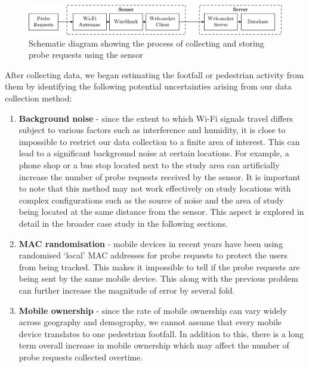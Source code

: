 \begin{figure} 
	\centering \includegraphics[width=\linewidth]
		{images/datacollection_schematic.jpeg}
	\caption 
		{Schematic diagram showing the process of collecting and storing probe
		requests using the sensor}
	\label{datacollection_schematic} 
\end{figure}

After collecting data, we began estimating the footfall or pedestrian activity
from them by identifying the following potential uncertainties arising from our
data collection method:

\begin{enumerate} 
\item 
\textbf{Background noise} - since the extent to which Wi-Fi signals travel
        differs subject to various factors such as interference and humidity, it
        is close to impossible to restrict our data collection to a finite area
        of interest. This can lead to a significant background noise at certain
        locations. For example, a phone shop or a bus stop located next to the
        study area can artificially increase the number of probe requests
        received by the sensor.  It is important to note that this method may
        not work effectively on study locations with complex configurations such
        as the source of noise and the area of study being located at the same
        distance from the sensor. This aspect is explored in detail in the
        broader case study in the following sections.
\item 
\textbf{MAC randomisation} - mobile devices in recent years have been using
        randomised `local' MAC addresses for probe requests to protect the users
        from being tracked. This makes it impossible to tell if the probe
        requests are being sent by the same mobile device. This along with the
        previous problem can further increase the magnitude of error by several
        fold.
\item
\textbf{Mobile ownership} - since the rate of mobile ownership can vary widely
		across geography and demography, we cannot assume that every mobile
		device translates to one pedestrian footfall. In addition to this, there
		is a long term overall increase in mobile ownership which may affect 
		the number of probe requests collected overtime.
\end{enumerate}

